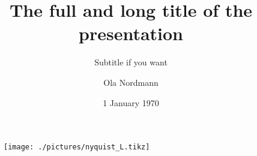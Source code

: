\documentclass[screen, aspectratio=43]{beamer}
\title[Short title]{The full and long title of the presentation}
\subtitle{Subtitle if you want}
\author[O. Nordmann]{Ola Nordmann}
\institute[NTNU]{Department of \LaTeX-ical sciences, NTNU}
\date{1 January 1970}
\begin{document}
\begin{frame}
  \titlepage
\end{frame}
\begin{frame}
	\begin{figure}
	\texttt{[image: ./pictures/nyquist\_L.tikz]}
	\end{figure}
\end{frame}
\end{document}
